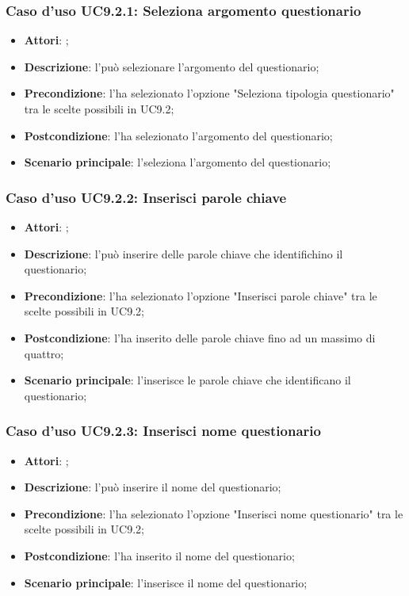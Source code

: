 		\subsubsection{Caso d'uso UC9.2.1: Seleziona argomento questionario}
		\label{UC9.2.1}
		\begin{itemize}
			\item \textbf{Attori}: \uaupro;
			\item \textbf{Descrizione}: l'\uaupro può selezionare l'argomento del questionario; 
			\item \textbf{Precondizione}: l'\uaupro ha selezionato l'opzione "Seleziona tipologia questionario" tra le scelte possibili in UC9.2;
			\item \textbf{Postcondizione}: l'\uaupro ha selezionato l'argomento del questionario;
			\item \textbf{Scenario principale}: l'\uaupro seleziona l'argomento del questionario;
		\end{itemize}
		
		\subsubsection{Caso d'uso UC9.2.2: Inserisci parole chiave}
		\label{UC9.2.2}
		\begin{itemize}
			\item \textbf{Attori}: \uaupro;
			\item \textbf{Descrizione}: l'\uaupro può inserire delle parole chiave che identifichino il questionario; 
			\item \textbf{Precondizione}: l'\uaupro ha selezionato l'opzione "Inserisci parole chiave" tra le scelte possibili in UC9.2;
			\item \textbf{Postcondizione}: l'\uaupro ha inserito delle parole chiave fino ad un massimo di quattro; 
			\item \textbf{Scenario principale}: l'\uaupro inserisce le parole chiave che identificano il questionario;
		\end{itemize}
			
		\subsubsection{Caso d'uso UC9.2.3: Inserisci nome questionario}
		\label{UC9.2.3}
		\begin{itemize}
			\item \textbf{Attori}: \uaupro;
			\item \textbf{Descrizione}: l'\uaupro può inserire il nome del questionario; 
			\item \textbf{Precondizione}: l'\uaupro ha selezionato l'opzione "Inserisci nome questionario" tra le scelte possibili in UC9.2;
			\item \textbf{Postcondizione}: l'\uaupro ha inserito il nome del questionario; 
			\item \textbf{Scenario principale}: l'\uaupro inserisce il nome del questionario;
		\end{itemize}
				
